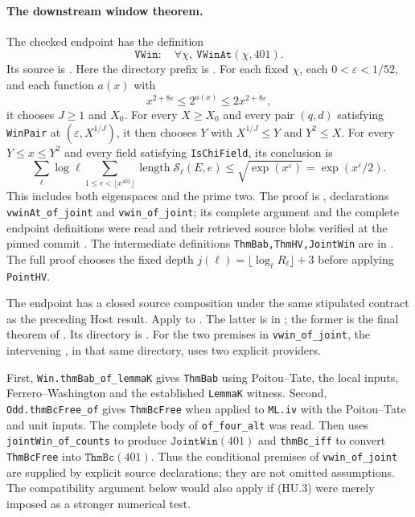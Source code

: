 \documentclass[11pt,a4paper]{article}
\theoremstyle{definition}
\begin{document}
\paragraph{The downstream window theorem.}
The checked endpoint has the definition
\[
 \texttt{VWin}:\quad
       \forall\chi,\ \texttt{VWinAt}(\chi,401).
\]
Its source is .
Here the directory prefix is
.
For each fixed $\chi$, each $0<\varepsilon<1/52$, and each function
$a(x)$ with
\[
 x^{2+8\varepsilon}\le 2^{a(x)}
      \le 2x^{2+8\varepsilon},
\]
it chooses $J\ge1$ and $X_0$.  For every $X\ge X_0$ and every
pair $(q,d)$ satisfying \texttt{WinPair} at
$(\varepsilon,X^{1/J})$, it then chooses $Y$ with
$X^{1/J}\le Y$ and $Y^2\le X$.  For every $Y\le x\le Y^2$
and every field satisfying \texttt{IsChiField}, its conclusion is
\[
 \sum_{\ell}\log\ell
     \sum_{1\le e<\lfloor x^{401}\rfloor}
           \operatorname{length}\mathcal S_\ell(E,e)
      \le \sqrt{\exp(x^\varepsilon)}
      =\exp(x^\varepsilon/2).
 \tag{HU.3}
\]
This includes both eigenspaces and the prime two.  The proof is
,
declarations \texttt{vwinAt\_of\_joint} and
\texttt{vwin\_of\_joint}; its complete argument and the
complete endpoint definitions were read and their retrieved source
blobs verified at the pinned commit \cite{K17PinnedLeanMirror}.
The intermediate definitions \texttt{ThmBab,ThmHV,JointWin} are in
.
The full proof 
chooses the fixed depth
$j(\ell)=\lfloor\log_\ell R_\ell\rfloor+3$ before applying
\texttt{PointHV}.

\begin{sloppypar}
The endpoint has a closed source composition under the same stipulated
contract as the preceding Host result.  Apply
to .
The latter is in ; the former
is the final theorem of .
Its directory is
\allowbreak%
.
For the two premises in \texttt{vwin\_of\_joint}, the intervening
, in that same directory,
uses two explicit providers.

First, \texttt{Win.thmBab\_of\_lemmaK} gives \texttt{ThmBab}
using Poitou--Tate, the local inputs, Ferrero--Washington and
the established \texttt{LemmaK} witness.
Second, \texttt{Odd.thmBcFree\_of} gives \texttt{ThmBcFree}
when applied to \texttt{ML.iv} with the Poitou--Tate and unit inputs.
The complete body of \texttt{of\_four\_alt} was read.
Then 
uses \texttt{jointWin\_of\_counts} to produce
$\texttt{JointWin}(401)$ and \texttt{thmBc\_iff} to convert
\texttt{ThmBcFree} into $\texttt{ThmBc}(401)$.
Thus the conditional premises of \texttt{vwin\_of\_joint} are
supplied by explicit source declarations; they are not omitted
assumptions.  The compatibility argument below would also apply
if (HU.3) were merely imposed as a stronger numerical test.
\end{sloppypar}
\end{document}
